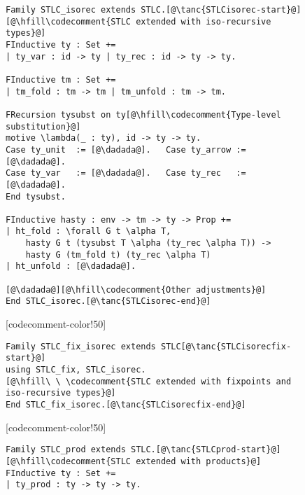 \begin{figure}

\begin{minipage}{\textwidth}
\begin{multicols}{2}


\begin{lstlisting}
Family STLC_isorec extends STLC.[@\tanc{STLCisorec-start}@]
[@\hfill\codecomment{STLC extended with iso-recursive types}@]
FInductive ty : Set +=
| ty_var : id -> ty | ty_rec : id -> ty -> ty.

FInductive tm : Set +=
| tm_fold : tm -> tm | tm_unfold : tm -> tm.

FRecursion tysubst on ty[@\hfill\codecomment{Type-level substitution}@]
motive \lambda(_ : ty), id -> ty -> ty.
Case ty_unit  := [@\dadada@].   Case ty_arrow := [@\dadada@].
Case ty_var   := [@\dadada@].   Case ty_rec   := [@\dadada@].
End tysubst.

FInductive hasty : env -> tm -> ty -> Prop +=
| ht_fold : \forall G t \alpha T,
    hasty G t (tysubst T \alpha (ty_rec \alpha T)) ->
    hasty G (tm_fold t) (ty_rec \alpha T)
| ht_unfold : [@\dadada@].

[@\dadada@][@\hfill\codecomment{Other adjustments}@]
End STLC_isorec.[@\tanc{STLCisorec-end}@]
\end{lstlisting}

[codecomment-color!50]

\vspace{-12pt}


\begin{lstlisting}
Family STLC_fix_isorec extends STLC[@\tanc{STLCisorecfix-start}@]
using STLC_fix, STLC_isorec.
[@\hfill\ \ \codecomment{STLC extended with fixpoints and iso-recursive types}@]
End STLC_fix_isorec.[@\tanc{STLCisorecfix-end}@]
\end{lstlisting}

[codecomment-color!50]

\columnbreak


\begin{lstlisting}
Family STLC_prod extends STLC.[@\tanc{STLCprod-start}@]
[@\hfill\codecomment{STLC extended with products}@]
FInductive ty : Set +=
| ty_prod : ty -> ty -> ty.


\end{lstlisting}
\end{multicols}
\end{minipage}
\end{figure}
